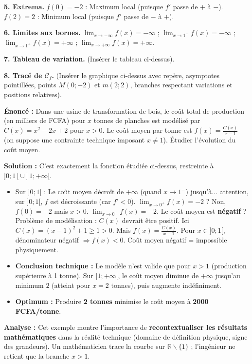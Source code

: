 \documentclass[11pt]{article}
\def\setminus{\mathbin{\backslash}}\let\smallsetminus\setminus
\begin{document}
\begin{exemplebox}
\noindent\textbf{5. Extrema.}
$f(0) = -2$ : Maximum local (puisque $f'$ passe de $+$ à $-$).
$f(2) = 2$ : Minimum local (puisque $f'$ passe de $-$ à $+$).

\noindent\textbf{6. Limites aux bornes.}
$\lim_{x\to -\infty} f(x) = -\infty$ ; $\lim_{x\to 1^-} f(x) = -\infty$ ; $\lim_{x\to 1^+} f(x) = +\infty$ ; $\lim_{x\to +\infty} f(x) = +\infty$.

\noindent\textbf{7. Tableau de variation.} (Insérer le tableau ci-dessus).

\noindent\textbf{8. Tracé de $\mathcal{C}_f$.} (Insérer le graphique ci-dessus avec repère, asymptotes pointillées, points $M(0;-2)$ et $m(2;2)$, branches respectant variations et positions relatives).
\end{exemplebox}

\begin{exoresolu}
\textbf{Énoncé :} Dans une usine de transformation de bois, le coût total de production (en milliers de FCFA) pour $x$ tonnes de planches est modélisé par $C(x) = x^2 - 2x + 2$ pour $x > 0$. Le coût moyen par tonne est $f(x) = \frac{C(x)}{x-1}$ (on suppose une contrainte technique imposant $x \neq 1$). Étudier l'évolution du coût moyen.

\textbf{Solution :}
C'est exactement la fonction étudiée ci-dessus, restreinte à $]0;1[ \cup ]1;+\infty[$.
\begin{itemize}
    \item Sur $]0;1[$ : Le coût moyen décroît de $+\infty$ (quand $x\to 1^-$) jusqu'à... attention, sur $]0;1[$, $f$ est décroissante (car $f'<0$). $\lim_{x\to 0^+} f(x) = -2$ ? Non, $f(0)=-2$ mais $x>0$. $\lim_{x\to 0^+} f(x) = -2$. Le coût moyen est \textbf{négatif} ? Problème de modélisation : $C(x)$ devrait être positif. Ici $C(x) = (x-1)^2+1 \ge 1 > 0$. Mais $f(x) = \frac{C(x)}{x-1}$. Pour $x \in ]0;1[$, dénominateur négatif $\Rightarrow f(x) < 0$. Coût moyen négatif = impossible physiquement.
    \item \textbf{Conclusion technique :} Le modèle n'est valide que pour $x > 1$ (production supérieure à 1 tonne). Sur $]1;+\infty[$, le coût moyen diminue de $+\infty$ jusqu'au minimum $2$ (atteint pour $x=2$ tonnes), puis augmente indéfiniment.
    \item \textbf{Optimum :} Produire \textbf{2 tonnes} minimise le coût moyen à \textbf{2000 FCFA/tonne}.
\end{itemize}
\tcblower
\textbf{Analyse :} Cet exemple montre l'importance de \textbf{recontextualiser les résultats mathématiques} dans la réalité technique (domaine de définition physique, signe des grandeurs). Un mathématicien trace la courbe sur $\mathbb{R}\setminus\{1\}$ ; l'ingénieur ne retient que la branche $x>1$.
\end{exoresolu}
\end{document}
